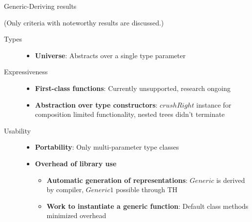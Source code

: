 \documentclass[10pt]{beamer}
\begin{document}
\begin{frame}{Generic-Deriving results}

(Only criteria with noteworthy results are discussed.)
\begin{description}
\item[Types]
\begin{itemize}
\item \textbf{Universe}: Abstracts over a single type parameter
\end{itemize}
\end{description}

\begin{description}
\item[Expressiveness]
\begin{itemize}
\item \textbf{First-class functions}: Currently unsupported, research ongoing
\item \textbf{Abstraction over type constructors}: $ crushRight $ instance for composition limited functionality, nested trees didn't terminate
\end{itemize}
\end{description}

\begin{description}
\item[Usability]
\begin{itemize}
\item \textbf{Portability}: Only multi-parameter type classes
\item \textbf{Overhead of library use}
\begin{itemize}
\item \textbf{Automatic generation of representations}: $ Generic $ is derived by compiler, $ Generic1 $ possible through TH
\item \textbf{Work to instantiate a generic function}: Default class methods minimized overhead
\end{itemize}
\end{itemize}
\end{description}

\end{frame}
\end{document}
